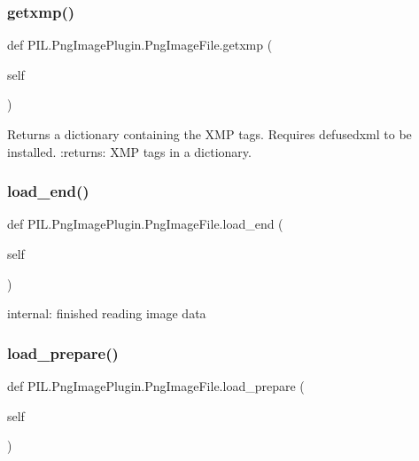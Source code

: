 \subsubsection{\texorpdfstring{getxmp()}{getxmp()}}
{\footnotesize\ttfamily def P\+I\+L.\+Png\+Image\+Plugin.\+Png\+Image\+File.\+getxmp (\begin{DoxyParamCaption}\item[{}]{self }\end{DoxyParamCaption})}

\begin{DoxyVerb}Returns a dictionary containing the XMP tags.
Requires defusedxml to be installed.
:returns: XMP tags in a dictionary.
\end{DoxyVerb}
 \mbox{\label{classPIL_1_1PngImagePlugin_1_1PngImageFile_a9fa4632ac005afe109a361ccbee5d6ba}} 
\subsubsection{\texorpdfstring{load\+\_\+end()}{load\_end()}}
{\footnotesize\ttfamily def P\+I\+L.\+Png\+Image\+Plugin.\+Png\+Image\+File.\+load\+\_\+end (\begin{DoxyParamCaption}\item[{}]{self }\end{DoxyParamCaption})}

\begin{DoxyVerb}internal: finished reading image data\end{DoxyVerb}
 \mbox{\label{classPIL_1_1PngImagePlugin_1_1PngImageFile_ae88a25a4a2d6ed7fbfc2e5cdd1fedc82}} 
\subsubsection{\texorpdfstring{load\+\_\+prepare()}{load\_prepare()}}
{\footnotesize\ttfamily def P\+I\+L.\+Png\+Image\+Plugin.\+Png\+Image\+File.\+load\+\_\+prepare (\begin{DoxyParamCaption}\item[{}]{self }\end{DoxyParamCaption})}

